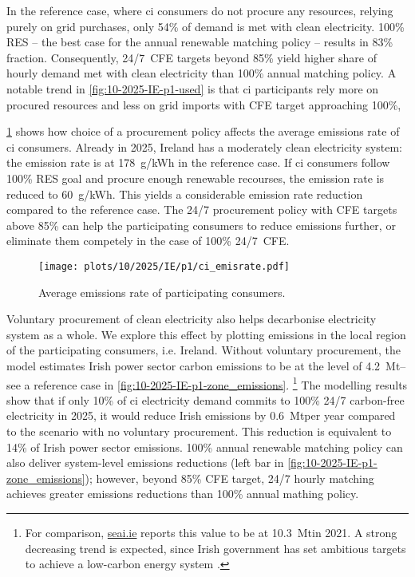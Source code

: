 In the reference case, where \gls{ci} consumers do not procure any resources, relying purely on grid purchases, only 54\% of demand is met with clean electricity.
100\% RES -- the best case for the annual renewable matching policy -- results in 83\% fraction. 
Consequently, 24/7~CFE targets beyond 85\% yield higher share of hourly demand met with clean electricity than 100\% annual matching policy.
A notable trend in \cref{fig:10-2025-IE-p1-used} is that \gls{ci} participants rely more on procured resources and less on grid imports with CFE target approaching 100\%,

\cref{fig:10-2025-IE-p1-ci_emisrate} shows how choice of a procurement policy affects the average emissions rate of \gls{ci} consumers.
Already in 2025, Ireland has a moderately clean electricity system: the emission rate is at 178~g\co/kWh in the reference case. 
If \gls{ci} consumers follow 100\% RES goal and procure enough renewable recourses, the emission rate is reduced to 60~g\co/kWh.
This yields a considerable emission rate reduction compared to the reference case.
The 24/7 procurement policy with CFE targets above 85\% can help the participating consumers to reduce emissions further, or eliminate them competely in the case of 100\% 24/7~CFE.

\begin{figure}
    \centering
    \texttt{[image: plots/10/2025/IE/p1/ci\_emisrate.pdf]}
    \caption{Average emissions rate of participating consumers.}
    \label{fig:10-2025-IE-p1-ci_emisrate}
\end{figure}

Voluntary procurement of clean electricity also helps decarbonise electricity system as a whole.
We explore this effect by plotting \co emissions in the local region of the participating consumers, i.e. Ireland.
Without voluntary procurement, the model estimates Irish power sector carbon emissions to be at the level of 4.2~Mt\co -- see a reference case in \cref{fig:10-2025-IE-p1-zone_emissions}.
\footnote{For comparison, \href{https://www.seai.ie/data-and-insights/seai-statistics/key-publications/co2-emissions-report/}{seai.ie} reports this value to be at 10.3~Mt\co in 2021.
A strong decreasing trend is expected, since Irish government has set ambitious targets to achieve a low-carbon energy system \cite{SEAI}.}
The modelling results show that if only 10\% of \gls{ci} electricity demand commits to 100\% 24/7 carbon-free electricity in 2025, it would reduce Irish emissions by 0.6~Mt\co per year compared to the scenario with no voluntary procurement.
This reduction is equivalent to 14\% of Irish power sector emissions.
100\% annual renewable matching policy can also deliver system-level \co emissions reductions (left bar in \cref{fig:10-2025-IE-p1-zone_emissions}); however, beyond 85\% CFE target, 24/7 hourly matching achieves greater emissions reductions than 100\% annual mathing policy.

